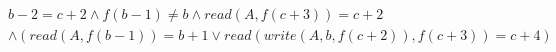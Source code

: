 \begin{align*}
%
& %
b - 2 = c + 2
%
\land
%
f(b - 1)  \neq  b
%
\land
%
\mathit{read}(A,f(c + 3)) = c + 2
~\\~
& %
%
\land
%
(\mathit{read}(A,f(b - 1)) = b + 1 \lor \mathit{read}(\mathit{write}(A,b,f(c + 2)),f(c + 3)) = c + 4)
%
\end{align*}
